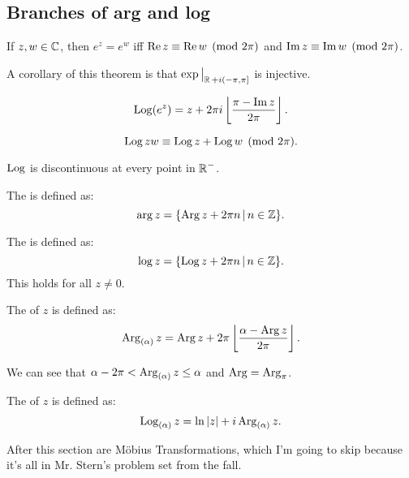 \subsection{Branches of arg and log}

\begin{theorem}
    If $z, w \in \operatorname{\mathbb{C}}$, then $e^z = e^w$ iff $\operatorname{Re} z \equiv \operatorname{Re} w
    \pmod{2\pi}$ and $\operatorname{Im} z \equiv \operatorname{Im} w \pmod{2\pi}$.
\end{theorem}

A corollary of this theorem is that $\exp \big|_{\operatorname{\mathbb{R}} + i(-\pi, \pi]}$ is injective.

\begin{theorem}
    \[ \operatorname{Log}(e^z) = z + 2\pi i \left \lfloor{\frac{\pi - \operatorname{Im}z}{2\pi}}\right \rfloor. \]
\end{theorem}

\begin{theorem}
    \[ \operatorname{Log} zw \equiv \operatorname{Log} z + \operatorname{Log} w \pmod{2\pi}. \]
\end{theorem}

\begin{theorem}
    $\operatorname{Log}$ is discontinuous at every point in $\operatorname{\mathbb{R}}^-$.
\end{theorem}

\begin{definition}
    The  is defined as:
    \[ \arg z = \{ \operatorname{Arg} z + 2\pi n \, | \, n \in \operatorname{\mathbb{Z}} \}. \]
\end{definition}

\begin{definition}
    The  is defined as:
    \[ \log z = \{ \operatorname{Log} z + 2\pi n \, | \, n \in \operatorname{\mathbb{Z}} \}. \]
    This holds for all $z \ne 0$.
\end{definition}

\begin{definition}
    The  of $z$ is defined as:
    \[ \operatorname{Arg}_{(\alpha)} z = \operatorname{Arg} z + 2\pi \left \lfloor{\frac{\alpha - \operatorname{Arg}z}{2\pi}}\right \rfloor. \]
\end{definition}
We can see that $\alpha - 2\pi < \operatorname{Arg}_{(\alpha)} z \le \alpha$
and $\operatorname{Arg} = \operatorname{Arg}_{\pi}$.

\begin{definition}
    The  of $z$ is defined as:
    \[ \operatorname{Log}_{(\alpha)} z = \ln |z| + i \operatorname{Arg}_{(\alpha)} z. \]
\end{definition}

After this section are M\"{o}bius Transformations,
which I'm going to skip because it's all in Mr. Stern's
problem set from the fall.

